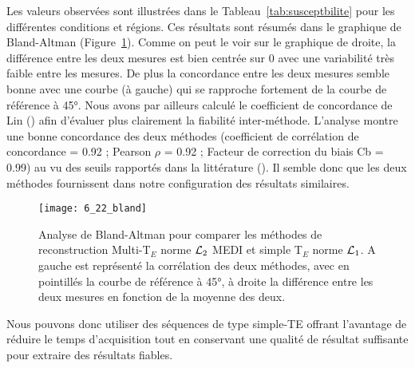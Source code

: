 {\begin {table}
\end{table}
Les valeurs observées sont illustrées dans le Tableau~\ref{tab:susceptbilite} pour les différentes conditions et
régions. Ces résultats sont résumés dans le graphique de Bland-Altman (Figure~\ref{fig:6_22_bland}). Comme on peut le
voir sur le graphique de droite, la différence entre les deux mesures est bien centrée sur 0 avec une
variabilité très faible entre les mesures. De plus la concordance entre les deux mesures semble bonne
avec une courbe (à gauche) qui se rapproche fortement de la courbe de référence à 45°. Nous avons
par ailleurs calculé le coefficient de concordance de Lin (\cite{Lin1989}) afin d’évaluer plus clairement la fiabilité
inter-méthode. L’analyse montre une bonne concordance des deux méthodes (coefficient de
corrélation de concordance = 0.92 ; Pearson $\rho$ = 0.92 ; Facteur de correction du biais Cb = 0.99) au vu
des seuils rapportés dans la littérature (\cite{Mcbride2005}). Il semble donc que les deux méthodes fournissent dans
notre configuration des résultats similaires.\\
\begin{figure}[!t]
\centering
\texttt{[image: 6\_22\_bland]}
\caption{Analyse de Bland-Altman pour comparer les méthodes de reconstruction Multi-T$_E$ norme ${\cal L}_2$ MEDI et simple T$_E$
norme ${\cal L}_1$. A gauche est représenté la corrélation des deux méthodes, avec en pointillés la courbe de référence à 45°, à droite
la différence entre les deux mesures en fonction de la moyenne des deux.}
\label{fig:6_22_bland}	
\end{figure}
Nous pouvons donc utiliser des séquences de type simple-TE offrant l’avantage de réduire le
temps d’acquisition tout en conservant une qualité de résultat suffisante pour extraire des résultats
fiables.
}
